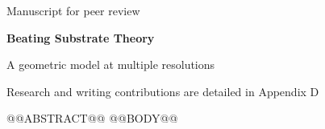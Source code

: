 \documentclass[11pt,a4paper]{article}
\begin{document}
{\sffamily\color{bst}\small Manuscript for peer review\par}\vspace{1.4cm}
{\sffamily\bfseries\fontsize{30}{36}\selectfont Beating Substrate Theory\par}\vspace{.3cm}
{\sffamily\Large A geometric model at multiple resolutions\par}\vspace{.75cm}
{\small Research and writing contributions are detailed in Appendix D\par}\vspace{1cm}
@@ABSTRACT@@
\clearpage\tableofcontents\clearpage
@@BODY@@
\end{document}
